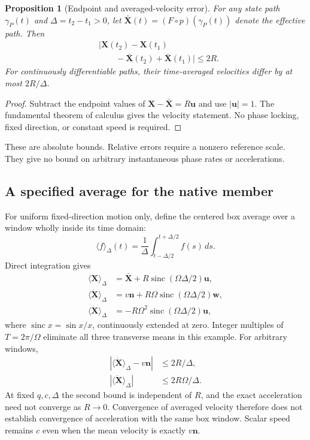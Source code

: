 \documentclass[11pt]{article}
\newtheorem{proposition}{Proposition}
\newcommand{\n}{\bm n}
\newcommand{\uu}{\bm u}
\newcommand{\ww}{\bm w}
\newcommand{\sinc}{\operatorname{sinc}}
\begin{document}
\begin{proposition}[Endpoint and averaged-velocity error]
For any state path $\gamma_P(t)$ and $\Delta=t_2-t_1>0$, let $\bar{\bm X}(t)=(F\circ p)(\gamma_P(t))$ denote the effective path. Then
\begin{equation}
 \begin{aligned}
 &|\bm X(t_2)-\bm X(t_1)\\
 &\qquad-\bar{\bm X}(t_2)+\bar{\bm X}(t_1)|\le2R.
 \end{aligned}
 \label{eq:endpoint}
\end{equation}
For continuously differentiable paths, their time-averaged velocities differ by at most $2R/\Delta$.
\end{proposition}
\begin{proof}
Subtract the endpoint values of $\bm X-\bar{\bm X}=R\uu$ and use $|\uu|=1$. The fundamental theorem of calculus gives the velocity statement. No phase locking, fixed direction, or constant speed is required.
\end{proof}
These are absolute bounds. Relative errors require a nonzero reference scale. They give no bound on arbitrary instantaneous phase rates or accelerations.

\subsection{A specified average for the native member}

For uniform fixed-direction motion only, define the centered box average over a window wholly inside its time domain:
\begin{equation}
 \langle f\rangle_\Delta(t)=\frac1\Delta
 \int_{t-\Delta/2}^{t+\Delta/2}f(s)\,ds.
\end{equation}
Direct integration gives
\begin{equation}
 \begin{aligned}
 \langle\bm X\rangle_\Delta&=\bar{\bm X}
          +R\sinc(\Omega\Delta/2)\uu,\\
 \langle\dot{\bm X}\rangle_\Delta&=v\n
          +R\Omega\sinc(\Omega\Delta/2)\ww,\\
 \langle\ddot{\bm X}\rangle_\Delta&=-R\Omega^2
                     \sinc(\Omega\Delta/2)\uu,
 \end{aligned}
 \label{eq:averages}
\end{equation}
where $\sinc x=\sin x/x$, continuously extended at zero. Integer multiples of $T=2\pi/\Omega$ eliminate all three transverse means in this example. For arbitrary windows,
\begin{equation}
 \begin{aligned}
 |\langle\dot{\bm X}\rangle_\Delta-v\n|&\le2R/\Delta,\\
 |\langle\ddot{\bm X}\rangle_\Delta|&\le2R\Omega/\Delta.
 \end{aligned}
 \label{eq:averagebounds}
\end{equation}
At fixed $q,c,\Delta$ the second bound is independent of $R$, and the exact acceleration need not converge as $R\to0$. Convergence of averaged velocity therefore does not establish convergence of acceleration with the same box window. Scalar speed remains $c$ even when the mean velocity is exactly $v\n$.
\end{document}
